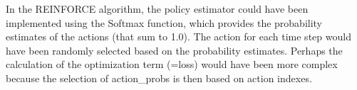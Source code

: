 \documentclass[12pt]{article}
\begin{document}
In the REINFORCE algorithm, the policy estimator could  have been implemented using the Softmax function, which provides the probability estimates of the actions (that sum to 1.0). The action for each time step would have been randomly selected based on the probability estimates. Perhaps the calculation of the optimization term (=loss) would have been more complex because the selection of action\_probs is then based on action indexes. 






\end{document}
